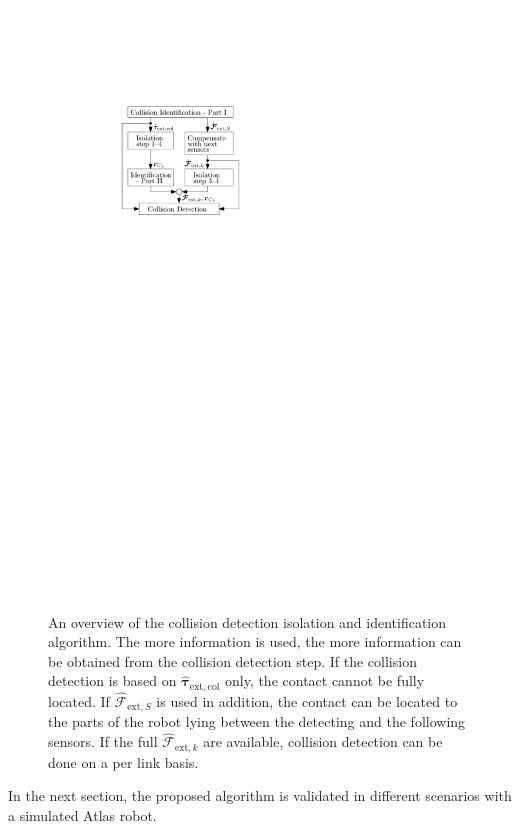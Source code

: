 \begin{figure}
\begin{center}
\includegraphics{figures/ueberblick}
\end{center}
\caption{An overview of the collision detection isolation and identification algorithm.
The more information is used, the more information can be obtained from the collision detection step.
If the collision detection is based on $\hat{\bm{\tau}}_\mathrm{ext,col}$ only, the contact cannot be fully located.
If $\hat{\bm{\mathcal{F}}}_{\mathrm{ext},S}$ is used in addition, the contact can be located to the parts of the robot lying between the detecting and the following sensors.
If the full $\hat{\bm{\mathcal{F}}}_{\mathrm{ext},k}$ are available, collision detection can be done on a per link basis.}\vspace*{-0.7cm}
\label{fig:ueberblick}
\end{figure}
%
In the next section, the proposed algorithm is validated in different scenarios with a simulated Atlas robot.

